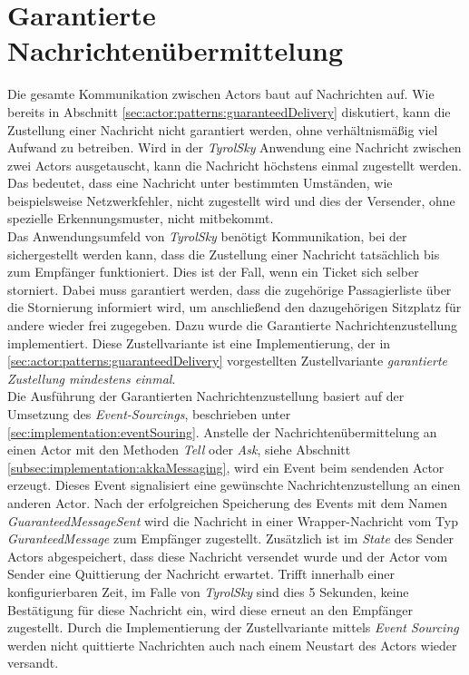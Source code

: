 \section{Garantierte Nachrichtenübermittelung}
Die gesamte Kommunikation zwischen Actors baut auf Nachrichten auf. Wie bereits in Abschnitt \ref{sec:actor:patterns:guaranteedDelivery} diskutiert, kann die Zustellung einer Nachricht nicht garantiert werden, ohne verhältnismäßig viel Aufwand zu betreiben. Wird in der \textit{TyrolSky} Anwendung eine Nachricht zwischen zwei Actors ausgetauscht, kann die Nachricht höchstens einmal zugestellt werden. Das bedeutet, dass eine Nachricht unter bestimmten Umständen, wie beispielsweise Netzwerkfehler, nicht zugestellt wird und dies der Versender, ohne spezielle Erkennungsmuster, nicht mitbekommt. \\
Das Anwendungsumfeld von \textit{TyrolSky} benötigt Kommunikation, bei der sichergestellt werden kann, dass die Zustellung einer Nachricht tatsächlich bis zum Empfänger funktioniert. Dies ist der Fall, wenn ein Ticket sich selber storniert. Dabei muss garantiert werden, dass die zugehörige Passagierliste über die Stornierung informiert wird, um anschließend den dazugehörigen Sitzplatz für andere wieder frei zugegeben. Dazu wurde die Garantierte Nachrichtenzustellung implementiert. Diese Zustellvariante ist eine Implementierung, der in \ref{sec:actor:patterns:guaranteedDelivery} vorgestellten Zustellvariante \textit{garantierte Zustellung mindestens einmal}. \\
Die Ausführung der Garantierten Nachrichtenzustellung basiert auf der Umsetzung des \textit{Event-Sourcings}, beschrieben unter \ref{sec:implementation:eventSouring}.
Anstelle der Nachrichtenübermittelung an einen Actor mit den Methoden \textit{Tell} oder \textit{Ask}, siehe Abschnitt \ref{subsec:implementation:akkaMessaging}, wird ein Event beim sendenden Actor erzeugt. Dieses Event signalisiert eine gewünschte Nachrichtenzustellung an einen anderen Actor. Nach der erfolgreichen Speicherung des Events mit dem Namen \textit{GuaranteedMessageSent} wird die Nachricht in einer Wrapper-Nachricht vom Typ \textit{GuranteedMessage} zum Empfänger zugestellt. Zusätzlich ist im \textit{State} des Sender Actors abgespeichert, dass diese Nachricht versendet wurde und der Actor vom Sender eine Quittierung der Nachricht erwartet. Trifft innerhalb einer konfigurierbaren Zeit, im Falle von \textit{TyrolSky} sind dies 5 Sekunden, keine Bestätigung für diese Nachricht ein, wird diese erneut an den Empfänger zugestellt. Durch die Implementierung der Zustellvariante mittels \textit{Event Sourcing} werden nicht quittierte Nachrichten auch nach einem Neustart des Actors wieder versandt. \\
